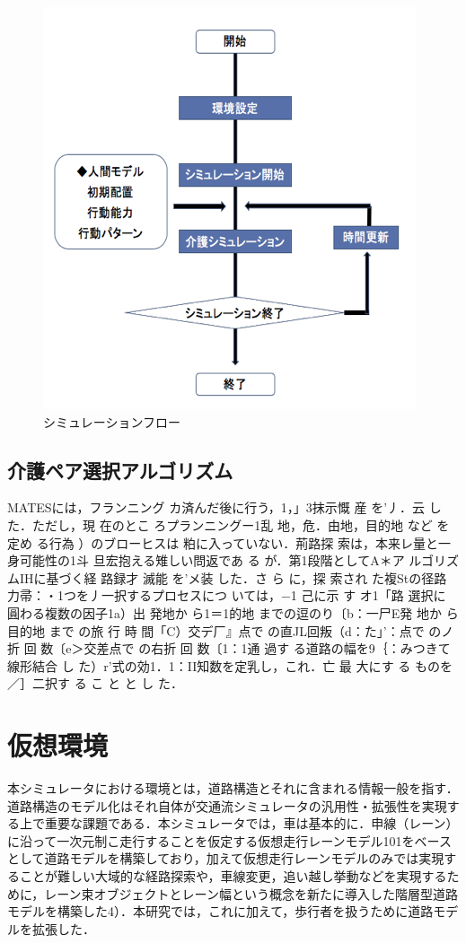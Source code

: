 \begin{figure}[htb]
\begin{center}
 \includegraphics[scale=0.6]{figures/simulation_flow.png}
 \caption[シミュレーションフロー]{シミュレーションフロー \label{simulation_flow}}
\end{center}
\end{figure}

\subsection{介護ペア選択アルゴリズム}

MATESには，フランニング カ済んだ後に行う，1，」3抹示慨 産 を’丿．云 した．ただし，現 在のとこ ろプランニングー1乱 地，危．由地，目的地 など を定め る行為 ）のブローヒスは 粕に入っていない．荊路探 索は，本来レ量と一身可能性の1斗 旦宏抱える雉しい問返であ る が．第1段階としてA＊ア ルゴリズムIHに基づく経 路録才 滅能 を’メ装 した．さ ら に，探 索され た複Stの径路 力帚：・1つを丿一択するプロセスにつ  いては，−1   己に示 す オ1「路 選択に 圓わる複数の因子1a）出 発地か ら1＝1的地 までの逗のり〔b：一尸E発 地か ら目的地 まで の旅 行 時 間「C）交デ厂』点で の直JL回叛（d：た」’：点で のノ折 回 数〔e＞交差点で の右折 回 数〔1：1通 過す る道路の幅を9｛：みつきて線形結合 し た）r’式の効1．1：II知数を定乳し，これ．亡 最 大にす る ものを ／］二択す  る こ と と し た．

\section{仮想環境}
本シミュレータにおける環境とは，道路構造とそれに含まれる情報一般を指す．道路構造のモデル化はそれ自体が交通流シミュレータの汎用性・拡張性を実現する上で重要な課題である．本シミュレータでは，車は基本的に．申線（レーン）に沿って一次元制こ走行することを仮定する仮想走行レーンモデル101をベースとして道路モデルを構築しており，加えて仮想走行レーンモデルのみでは実現することが難しい大域的な経路探索や，車線変更，追い越し挙動などを実現するために，レーン束オブジェクトとレーン幅という概念を新たに導入した階層型道路モデルを構築した4）．本研究では，これに加えて，歩行者を扱うために道路モデルを拡張した．

